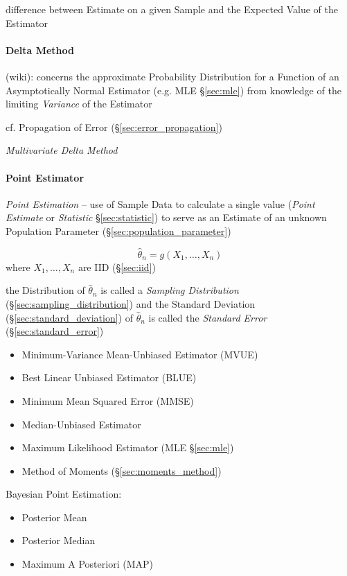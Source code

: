 difference between Estimate on a given Sample and the Expected Value of the
Estimator



\paragraph{Delta Method}\label{sec:delta_method}\hfill

(wiki): concerns the approximate Probability Distribution for a Function of an
Asymptotically Normal Estimator (e.g. MLE \S\ref{sec:mle}) from knowledge of the
limiting \emph{Variance} of the Estimator

\fist cf. Propagation of Error (\S\ref{sec:error_propagation})

\emph{Multivariate Delta Method}



\paragraph{Point Estimator}\label{sec:point_estimator}\hfill

\emph{Point Estimation} -- use of Sample Data to calculate a single value
(\emph{Point Estimate} or \emph{Statistic} \S\ref{sec:statistic}) to serve as an
Estimate of an unknown Population Parameter (\S\ref{sec:population_parameter})

\[
  \hat{\theta}_n = g(X_1, \ldots, X_n)
\]
where $X_1, \ldots, X_n$ are IID (\S\ref{sec:iid})

the Distribution of $\hat{\theta}_n$ is called a \emph{Sampling Distribution}
(\S\ref{sec:sampling_distribution}) and the Standard Deviation
(\S\ref{sec:standard_deviation}) of $\hat{\theta}_n$ is called the
\emph{Standard Error} (\S\ref{sec:standard_error})

\begin{itemize}
  \item Minimum-Variance Mean-Unbiased Estimator (MVUE)
  \item Best Linear Unbiased Estimator (BLUE)
  \item Minimum Mean Squared Error (MMSE)
  \item Median-Unbiased Estimator
  \item Maximum Likelihood Estimator (MLE \S\ref{sec:mle})
  \item Method of Moments (\S\ref{sec:moments_method})
\end{itemize}

Bayesian Point Estimation:
\begin{itemize}
  \item Posterior Mean
  \item Posterior Median
  \item Maximum A Posteriori (MAP)
\end{itemize}


